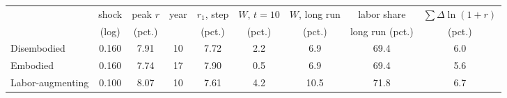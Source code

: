 \begin{tabular}{lcccccccc}\toprule
 & shock & peak $r$ & year & $r_1$, step & $W$, $t{=}10$ & $W$, long run & labor share & $\sum\Delta\ln(1+r)$\\
 & (log) & (pct.) & & (pct.) & (pct.) & (pct.) & long run (pct.) & (pct.)\\\midrule
Disembodied & 0.160 & 7.91 & 10 & 7.72 & 2.2 & 6.9 & 69.4 & 6.0\\
Embodied & 0.160 & 7.74 & 17 & 7.90 & 0.5 & 6.9 & 69.4 & 5.6\\
Labor-augmenting & 0.100 & 8.07 & 10 & 7.61 & 4.2 & 10.5 & 71.8 & 6.7\\
\bottomrule\end{tabular}
